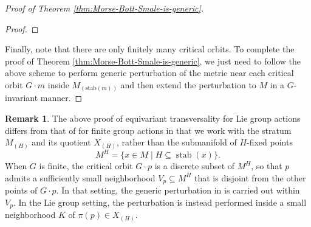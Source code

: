 \documentclass[11pt]{amsart}
\theoremstyle{definition}
\newtheorem{remark}[theorem]{Remark}
\numberwithin{equation}{subsection}
\DeclareMathOperator{\crit}{Crit}
\DeclareMathOperator{\stab}{stab}
\newcommand{\des}{\mathscr{D}}
\newcommand{\asc}{\mathscr{A}}
\begin{document}
\begin{proof}[Proof of Theorem \ref{thm:Morse-Bott-Smale-is-generic}]
\begin{proof}
\end{proof}

Finally, note that there are only finitely many critical orbits. To complete the proof of Theorem \ref{thm:Morse-Bott-Smale-is-generic}, we just need to follow the above scheme to perform generic perturbation of the metric near each critical orbit $G\cdot m$ inside $M_{(\text{stab}(m))}$ and then extend the perturbation to $M$ in a $G$-invariant manner.

\end{proof}


    \begin{remark}
The above proof of equivariant transversality for Lie group actions differs from that of \cite{bao2024morse} for finite group actions in that we work with the stratum $M_{(H)}$ and its quotient $X_{(H)}$, rather than the submanifold of $H$-fixed points
\[
M^{H}=\{x\in M \mid H\subseteq \operatorname{stab}(x)\}.
\]
When $G$ is finite, the critical orbit $G\cdot p$ is a discrete subset of $M^{H}$, so that $p$ admits a sufficiently small neighborhood $V_{p}\subseteq M^H$ that is disjoint from the other points of $G\cdot p$. In that setting, the generic perturbation in \cite{bao2024morse} is carried out within $V_{p}$. In the Lie group setting, the perturbation is instead performed inside a small neighborhood $K$ of $\pi(p)\in X_{(H)}$.
\end{remark}




\end{document}
